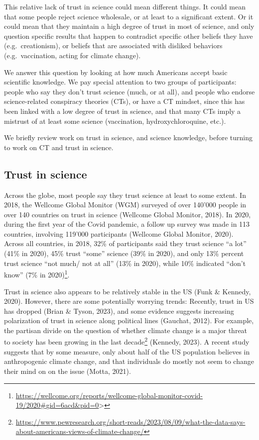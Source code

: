\documentclass[
  doc,floatsintext]{apa6}
\begin{document}
This relative lack of trust in science could mean different things. It could mean that some people reject science wholesale, or at least to a significant extent. Or it could mean that they maintain a high degree of trust in most of science, and only question specific results that happen to contradict specific other beliefs they have (e.g.~creationism), or beliefs that are associated with disliked behaviors (e.g.~vaccination, acting for climate change).

We answer this question by looking at how much Americans accept basic scientific knowledge. We pay special attention to two groups of participants: people who say they don't trust science (much, or at all), and people who endorse science-related conspiracy theories (CTs), or have a CT mindset, since this has been linked with a low degree of trust in science, and that many CTs imply a mistrust of at least some science (vaccination, hydroxychloroquine, etc.).

We briefly review work on trust in science, and science knowledge, before turning to work on CT and trust in science.

\subsection{Trust in science}\label{trust-in-science}

Across the globe, most people say they trust science at least to some extent. In 2018, the Wellcome Global Monitor (WGM) surveyed of over 140'000 people in over 140 countries on trust in science (Wellcome Global Monitor, 2018). In 2020, during the first year of the Covid pandemic, a follow up survey was made in 113 countries, involving 119'000 participants (Wellcome Global Monitor, 2020). Across all countries, in 2018, 32\% of participants said they trust science ``a lot'' (41\% in 2020), 45\% trust ``some'' science (39\% in 2020), and only 13\% percent trust science ``not much/ not at all'' (13\% in 2020), while 10\% indicated ``don't know'' (7\% in 2020)\footnote{\url{https://wellcome.org/reports/wellcome-global-monitor-covid-19/2020\#gid=6acd&pid=0}\textgreater{}}.

Trust in science also appears to be relatively stable in the US (Funk \& Kennedy, 2020). However, there are some potentially worrying trends: Recently, trust in US has dropped (Brian \& Tyson, 2023), and some evidence suggests increasing polarization of trust in science along political lines (Gauchat, 2012). For example, the partisan divide on the question of whether climate change is a major threat to society has been growing in the last decade\footnote{\url{https://www.pewresearch.org/short-reads/2023/08/09/what-the-data-says-about-americans-views-of-climate-change/}} (Kennedy, 2023). A recent study suggests that by some measure, only about half of the US population believes in anthropogenic climate change, and that individuals do mostly not seem to change their mind on on the issue (Motta, 2021).
\end{document}
